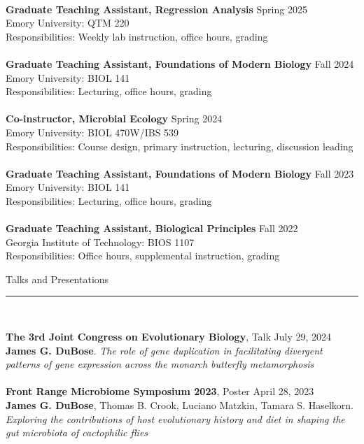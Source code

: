 \documentclass{article}
\begin{document}
\\
\textbf{Graduate Teaching Assistant, Regression Analysis} \hfill Spring 2025 \\
Emory University: QTM 220\\
Responsibilities: Weekly lab instruction, office hours, grading 
\\
\\
\textbf{Graduate Teaching Assistant, Foundations of Modern Biology} \hfill Fall 2024 \\
Emory University: BIOL 141\\
Responsibilities: Lecturing, office hours, grading 
\\
\\
\textbf{Co-instructor, Microbial Ecology} \hfill Spring 2024 \\
Emory University: BIOL 470W/IBS 539\\
Responsibilities: Course design, primary instruction, lecturing, discussion leading
\\
\\
\textbf{Graduate Teaching Assistant, Foundations of Modern Biology} \hfill Fall 2023 \\
Emory University: BIOL 141\\
Responsibilities: Lecturing, office hours, grading 
\\
\\
\textbf{Graduate Teaching Assistant, Biological Principles} \hfill Fall 2022\\
Georgia Institute of Technology: BIOS 1107 \\
Responsibilities: Office hours, supplemental instruction, grading
\\
\begin{flushleft}
{\Large Talks and Presentations} \rule{16.51cm}{0.4pt}\\
\end{flushleft}
\textbf{The 3rd Joint Congress on Evolutionary Biology}, Talk \hfill July 29, 2024\\
\textbf{James G. DuBose}. \emph{The role of gene duplication in facilitating divergent patterns of gene expression across the monarch butterfly metamorphosis}\\
\\
\textbf{Front Range Microbiome Symposium 2023}, Poster \hfill April 28, 2023\\
\textbf{James G. DuBose}, Thomas B. Crook, Luciano Matzkin, Tamara S. Haselkorn. \emph{Exploring the contributions of host evolutionary history and diet in shaping the gut microbiota of cactophilic flies}\\
\end{document}
